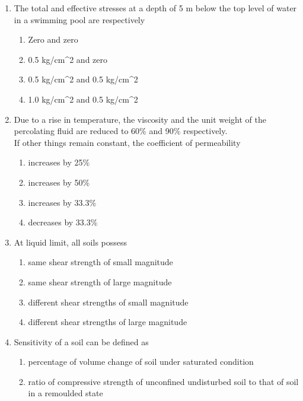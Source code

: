 \documentclass[11pt,a4paper]{article}
\begin{document}
\begin{enumerate}
{}
\\
\item{The total and effective stresses at a depth of 5 m below the top level of water in a swimming pool are respectively}
\begin{enumerate}[label=\Alph*.]
\item{Zero and zero}
\item{0.5 kg/cm\^{}2 and zero}
\item{0.5 kg/cm\^{}2 and 0.5 kg/cm\^{}2}
\item{1.0 kg/cm\^{}2 and 0.5 kg/cm\^{}2}
\end{enumerate}
\item{Due to a rise in temperature, the viscosity and the unit weight of the percolating fluid are reduced to 60\% and 90\% respectively. \\
If other things remain constant, the coefficient of permeability}
\begin{enumerate}[label=\Alph*.]
\item{increases by 25\%}
\item{increases by 50\%}
\item{increases by 33.3\%}
\item{decreases by 33.3\%}
\end{enumerate}
\item{At liquid limit, all soils possess}
\begin{enumerate}[label=\Alph*.]
\item{same shear strength of small magnitude}
\item{same shear strength of large magnitude}
\item{different shear strengths of small magnitude}
\item{different shear strengths of large magnitude}
\end{enumerate}
\item{Sensitivity of a soil can be defined as}
\begin{enumerate}[label=\Alph*.]
\item{percentage of volume change of soil under saturated condition}
\item{ratio of compressive strength of unconfined undisturbed soil to that of soil in a remoulded state}

\end{enumerate}
\end{enumerate}
\end{document}

